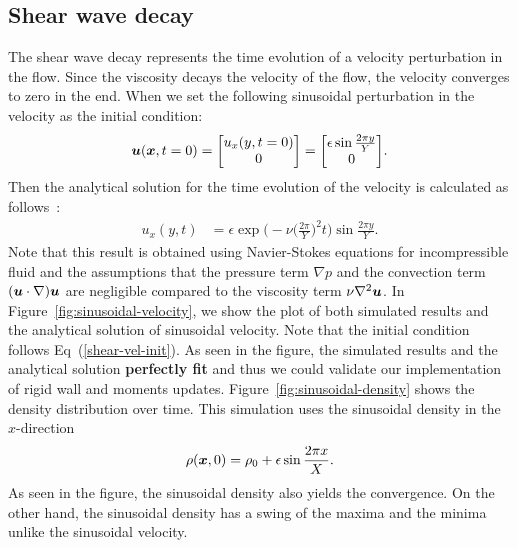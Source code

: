 \subsection{Shear wave decay}
The shear wave decay represents the time evolution of a
velocity perturbation in the flow.
Since the viscosity decays the velocity of the flow,
the velocity converges to zero in the end.
When we set the following sinusoidal perturbation in the velocity
as the initial condition:
\begin{equation}
  \begin{aligned}
    \boldsymbol{u}(\boldsymbol{x}, t = 0) =
    \begin{bmatrix}
      u_x(y, t = 0) \\
      0 \\
    \end{bmatrix}
    =  
    \begin{bmatrix}
      \epsilon \sin \frac{2\pi y}{Y} \\
        0 \\
      \end{bmatrix}
  \end{aligned}.
  \label{shear-vel-init}
\end{equation}
Then the analytical solution for the time evolution of 
the velocity is calculated as follows~\cite{fei2018three}:
\begin{equation}
  \begin{aligned}
    u_x(y, t) &= 
    \epsilon \exp\biggl(
      -\nu \biggl(
        \frac{2\pi}{Y}
      \biggr)^2 t\biggr) \sin \frac{2\pi y}{Y}.
  \end{aligned}
  \label{sinusoidal-vel-analytical-solution}
\end{equation}
Note that this result is obtained using Navier-Stokes equations for incompressible fluid
and the assumptions that the pressure term $\nabla p$ and
the convection term $(\boldsymbol{u} \cdot \nabla) \boldsymbol{u}$ are negligible 
compared to the viscosity term $\nu \nabla^2 \boldsymbol{u}$.
In Figure~\ref{fig:sinusoidal-velocity}, we show the plot of both
simulated results and the analytical solution of sinusoidal velocity.
Note that the initial condition follows Eq~(\ref{shear-vel-init}). 
As seen in the figure, the simulated results and the analytical solution
{\bf perfectly fit} and thus we could validate our implementation of
rigid wall and moments updates.
Figure~\ref{fig:sinusoidal-density} shows the density distribution
over time.
This simulation uses the sinusoidal density in the $x$-direction
\begin{equation}
\begin{aligned}
  \rho(\boldsymbol{x}, 0) = \rho_0 + \epsilon \sin \frac{2 \pi x}{X}.
\end{aligned}
\label{sinusoidal-density-init}
\end{equation}
As seen in the figure, the sinusoidal density also
yields the convergence.
On the other hand, the sinusoidal density has
a swing of the maxima and the minima unlike the sinusoidal velocity.


